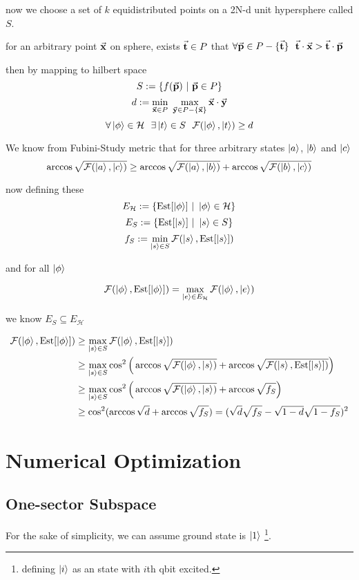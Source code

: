 \documentclass{article}
\DeclareMathOperator*{\est}{Est}
\begin{document}
now we choose a set of $k$ equidistributed points on a 2N-d unit hypersphere called $S$.

for an arbitrary point $\va{x}$ on sphere, exists $\va{t} \in P$ that $\forall \va{p} \in P - \{\va{t}\} ~~ \va{t}\cdot\va{x} > \va{t}\cdot \va{p}$

then by mapping to hilbert space
\[ S := \{ f(\va{p}) ~|~ \va{p} \in P \} \]
\[ d := \min_{\va{x} \in P} ~\max_{\va{y} \in P - \{\va{x}\}} \va{x}\cdot\va{y} \]
\[ \forall \ket{\phi} \in \mathcal{H} ~~ \exists \ket{t} \in S ~~ \mathcal{F}(\ket{\phi}, \ket{t}) \ge d \]

We know from Fubini-Study metric that for three arbitrary states $\ket{a}$, $\ket{b}$ and $\ket{c}$
\[ \arccos\sqrt{\mathcal{F}(\ket{a},\ket{c})} \ge \arccos\sqrt{\mathcal{F}(\ket{a},\ket{b})} + \arccos\sqrt{\mathcal{F}(\ket{b},\ket{c})}  \]

now defining these
\[ E_{\mathcal{H}} := \{\est[\ket{\phi}] ~|~ \ket{\phi} \in \mathcal{H} \} \]
\[ E_S := \{\est[\ket{s}] ~|~ \ket{s} \in S \} \]
\[ f_S := \min_{\ket{s} \in S} \mathcal{F}(\ket{s}, \est[\ket{s}]) \] 

and for all $\ket{\phi}$

\[ \mathcal{F}(\ket{\phi}, \est[\ket{\phi}]) = \max_{\ket{e} \in E_{\mathcal{H}}} \mathcal{F}(\ket{\phi}, \ket{e})\]

we know $E_S \subseteq E_{\mathcal{H}}$

\begin{align*} \mathcal{F}(\ket{\phi}, \est[\ket{\phi}]) &\ge \max_{\ket{s} \in S} \mathcal{F}(\ket{\phi}, \est[\ket{s}]) \\ &\ge \max_{\ket{s} \in S} \cos^2\Big( \arccos\sqrt{\mathcal{F} (\ket{\phi}, \ket{s})} + \arccos\sqrt{\mathcal{F}(\ket{s}, \est[\ket{s}])} \Big) 
\\ &\ge \max_{\ket{s} \in S} \cos^2\Big(\arccos\sqrt{\mathcal{F} (\ket{\phi}, \ket{s})} + \arccos{\sqrt{f_S}}\Big)  
\\ &\ge \cos^2(\arccos\sqrt{d} + \arccos\sqrt{f_S}) = (\sqrt{d}\sqrt{f_S} - \sqrt{1-d}\sqrt{1-f_S})^2
\end{align*}

\section{Numerical Optimization}
\subsection{One-sector Subspace}
For the sake of simplicity, we can assume ground state is $\ket{1}$%
\footnote{defining $\ket{i}$ as an state with $i$th qbit excited.}.
\end{document}
